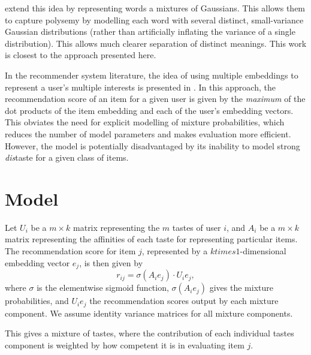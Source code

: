\documentclass[sigconf]{acmart}
\begin{document}
\citet{athiwaratkun2017multimodal} extend this idea by representing words a mixtures of Gaussians. This allows them to capture polysemy by modelling each word with several distinct, small-variance Gaussian distributions (rather than artificially inflating the variance of a single distribution). This allows much clearer separation of distinct meanings. This work is closest to the approach presented here.

In the recommender system literature, the idea of using multiple embeddings to represent a user's multiple interests is presented in \citet{weston2013nonlinear}. In this approach, the recommendation score of an item for a given user is given by the \emph{maximum} of the dot products of the item embedding and each of the user's embedding vectors. This obviates the need for explicit modelling of mixture probabilities, which reduces the number of model parameters and makes evaluation more efficient. However, the model is potentially disadvantaged by its inability to model strong \emph{dis}taste for a given class of items.

\section{Model}
Let $U_i$ be a $m \times k$ matrix representing the $m$ tastes of user $i$, and $A_i$ be a $m \times k$ matrix representing the affinities of each taste for representing particular items. The recommendation score for item $j$, represented by a $k times 1$-dimensional embedding vector $e_j$, is then given by
\begin{equation}
  r_{ij} = \sigma\left(A_ie_j\right) \cdot U_ie_j,
\end{equation}
where $\sigma$ is the elementwise sigmoid function, $\sigma\left(A_ie_j\right)$ gives the mixture probabilities, and $U_ie_j$ the recommendation scores output by each mixture component. We assume identity variance matrices for all mixture components.

This gives a mixture of tastes, where the contribution of each individual tastes component is weighted by how competent it is in evaluating item $j$.
\end{document}
